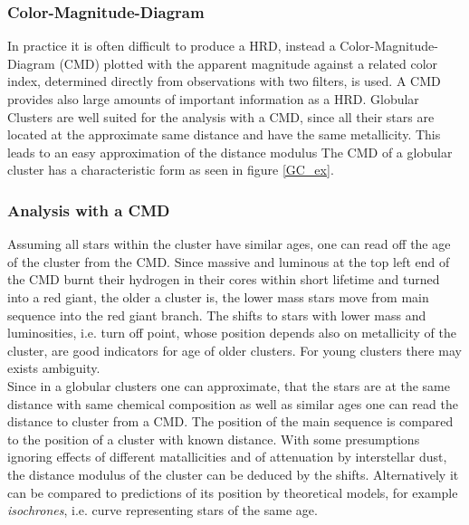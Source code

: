 \subsubsection{Color-Magnitude-Diagram}
In practice it is often difficult to produce a HRD, instead a Color-Magnitude-Diagram (CMD) plotted with the apparent magnitude against a related color index, determined directly from observations with two filters, is used. A CMD provides also large amounts of important information as a HRD.
Globular Clusters are well suited for the analysis with a CMD, since all their stars are located at the approximate same distance and have the same metallicity. This leads to an easy approximation of the distance modulus The CMD of a globular cluster has a characteristic form as seen in figure \ref{GC_ex}.
\hspace{4mm}
\subsubsection{Analysis with a CMD}
Assuming all stars within the cluster have similar ages, one can read off the age of the cluster from the CMD. Since massive and luminous at the top left end of the CMD burnt their hydrogen in their cores within short lifetime and turned into a red giant, the older a cluster is, the lower mass stars move from main sequence into the red giant branch. The shifts to stars with lower mass and luminosities, i.e. turn off point, whose position depends also on metallicity of the cluster, are good indicators for age of older clusters. For young clusters there may exists ambiguity. 
\vspace{3mm} \\
Since in a globular clusters one can approximate, that the stars are at the same distance with same chemical composition as well as similar ages one can read the distance to cluster from a CMD. The position of the main sequence is compared to the position of a cluster with known distance. With some presumptions ignoring effects of different matallicities and of attenuation by interstellar dust, the distance modulus of the cluster can be deduced by the shifts. Alternatively it can be compared to predictions of its position by theoretical models, for example \textit{isochrones}, i.e. curve representing stars of the same age. 
\vspace{10mm}